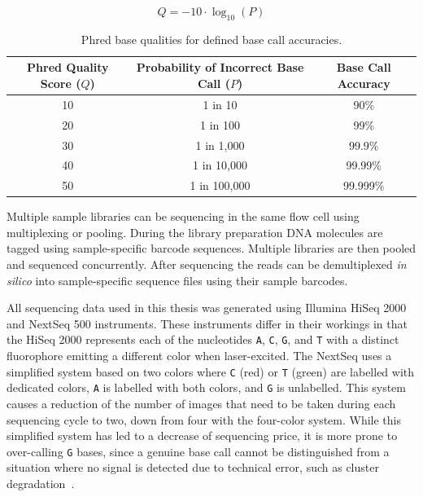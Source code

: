 \documentclass[11pt]{book}
\begin{document}
\begin{equation} \label{eq:phred}
Q = -10\cdot\log_{10}(P)
\end{equation}

\begin{table}[t]
\centering
\caption[Phred Base Qualities]{Phred base qualities for defined base call accuracies.}
\label{tab:phred}
\begin{tabular}{ ccc }
\toprule
Phred Quality Score ($Q$) & Probability of Incorrect Base Call ($P$) & Base Call Accuracy \\
\midrule
10                      & 1 in 10                                & 90\% \\
20                      & 1 in 100                               & 99\% \\
30                      & 1 in 1,000                             & 99.9\% \\
40                      & 1 in 10,000                            & 99.99\% \\
50                      & 1 in 100,000                           & 99.999\% \\
\bottomrule
\end{tabular}
\end{table}

Multiple sample libraries can be sequencing in the same flow cell using multiplexing or pooling. During the library preparation DNA molecules are tagged using sample-specific barcode sequences. Multiple libraries are then pooled and sequenced concurrently. After sequencing the reads can be demultiplexed \textit{in silico} into sample-specific sequence files using their sample barcodes.

All sequencing data used in this thesis was generated using Illumina HiSeq 2000 and NextSeq 500 instruments. These instruments differ in their workings in that the HiSeq 2000 represents each of the nucleotides \verb|A|, \verb|C|, \verb|G|, and \verb|T| with a distinct fluorophore emitting a different color when laser-excited. The NextSeq uses a simplified system based on two colors where \verb|C| (red) or \verb|T| (green) are labelled with dedicated colors, \verb|A| is labelled with both colors, and \verb|G| is unlabelled. This system causes a reduction of the number of images that need to be taken during each sequencing cycle to two, down from four with the four-color system. While this simplified system has led to a decrease of sequencing price, it is more prone to over-calling \verb|G| bases, since a genuine base call cannot be distinguished from a situation where no signal is detected due to technical error, such as cluster degradation~\cite{two-color-chemistry}.
\end{document}
